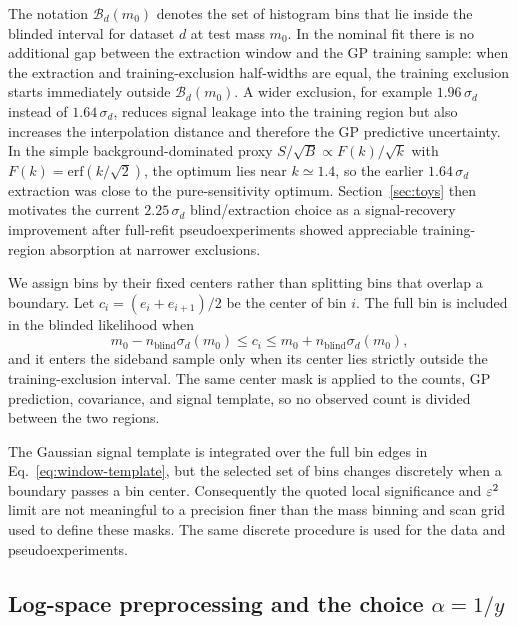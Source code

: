The notation $\mathcal{B}_d(m_0)$ denotes the set of histogram bins that lie inside the
blinded interval for dataset $d$ at test mass $m_0$. In the nominal fit there is no
additional gap between the extraction window and the GP
training sample: when the extraction and training-exclusion half-widths are equal, the
training exclusion starts immediately outside $\mathcal{B}_d(m_0)$. A wider exclusion,
for example $1.96\,\sigma_d$ instead of $1.64\,\sigma_d$, reduces signal leakage into
the training region but also increases the interpolation distance and therefore the GP
predictive uncertainty. In the simple background-dominated proxy
$S/\sqrt{B}\propto F(k)/\sqrt{k}$ with $F(k)=\mathrm{erf}(k/\sqrt{2})$, the optimum lies
near $k\simeq1.4$, so the earlier $1.64\,\sigma_d$ extraction was close to the
pure-sensitivity optimum. Section~\ref{sec:toys} then motivates the current
$2.25\,\sigma_d$ blind/extraction choice as a signal-recovery improvement after
full-refit pseudoexperiments showed appreciable training-region absorption at narrower
exclusions.

We assign bins by their fixed centers rather than splitting bins that overlap a
boundary. Let $c_i=(e_i+e_{i+1})/2$ be the center of bin $i$. The full
bin is included in the blinded likelihood when
\begin{equation}
m_0-n_{\mathrm{blind}}\sigma_d(m_0)
\le c_i \le
m_0+n_{\mathrm{blind}}\sigma_d(m_0),
\end{equation}
and it enters the sideband sample only when its center lies strictly outside the
training-exclusion interval. The same center mask is applied to the counts, GP
prediction, covariance, and signal template, so no observed count is divided between
the two regions.

The Gaussian signal template is integrated over the full bin edges in
Eq.~\eqref{eq:window-template}, but the selected set of bins changes discretely when a
boundary passes a bin center. Consequently the quoted local significance and
$\varepsilon^2$ limit are not meaningful to a precision finer than the mass binning and scan
grid used to define these masks. The same discrete procedure is used for the data and
pseudoexperiments.

\subsection{Log-space preprocessing and the choice \texorpdfstring{$\alpha=1/y$}{alpha=1/y}}

